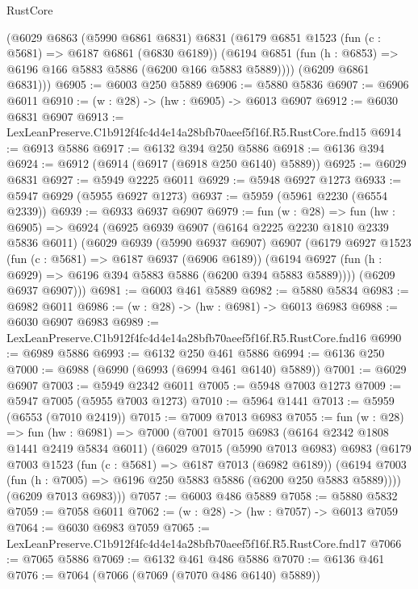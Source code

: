 \begin{lexlean}{RustCore}
\begin{coremodule}
      (@6029
        @6863
        (@5990 @6861 @6831)
        @6831
        (@6179
          @6851
          @1523
          (fun (c : @5681) => @6187 @6861 (@6830 @6189))
          (@6194 @6851 (fun (h : @6853) => @6196 @166 @5883 @5886 (@6200 @166 @5883 @5889))))
        (@6209 @6861 @6831)))
@6905 := @6003 @250 @5889
@6906 := @5880 @5836
@6907 := @6906 @6011
@6910 := (w : @28) -> (hw : @6905) -> @6013 @6907
@6912 := @6030 @6831 @6907
@6913 := LexLeanPreserve.C1b912f4fc4d4e14a28bfb70aeef5f16f.R5.RustCore.fnd15
@6914 := @6913 @5886
@6917 := @6132 @394 @250 @5886
@6918 := @6136 @394
@6924 := @6912 (@6914 (@6917 (@6918 @250 @6140) @5889))
@6925 := @6029 @6831
@6927 := @5949 @2225 @6011
@6929 := @5948 @6927 @1273
@6933 := @5947 @6929 (@5955 @6927 @1273)
@6937 := @5959 (@5961 @2230 (@6554 @2339))
@6939 := @6933 @6937 @6907
@6979 := fun (w : @28) =>
  fun (hw : @6905) =>
  @6924
    (@6925
      @6939
      @6907
      (@6164 @2225 @2230 @1810 @2339 @5836 @6011)
      (@6029
        @6939
        (@5990 @6937 @6907)
        @6907
        (@6179
          @6927
          @1523
          (fun (c : @5681) => @6187 @6937 (@6906 @6189))
          (@6194 @6927 (fun (h : @6929) => @6196 @394 @5883 @5886 (@6200 @394 @5883 @5889))))
        (@6209 @6937 @6907)))
@6981 := @6003 @461 @5889
@6982 := @5880 @5834
@6983 := @6982 @6011
@6986 := (w : @28) -> (hw : @6981) -> @6013 @6983
@6988 := @6030 @6907 @6983
@6989 := LexLeanPreserve.C1b912f4fc4d4e14a28bfb70aeef5f16f.R5.RustCore.fnd16
@6990 := @6989 @5886
@6993 := @6132 @250 @461 @5886
@6994 := @6136 @250
@7000 := @6988 (@6990 (@6993 (@6994 @461 @6140) @5889))
@7001 := @6029 @6907
@7003 := @5949 @2342 @6011
@7005 := @5948 @7003 @1273
@7009 := @5947 @7005 (@5955 @7003 @1273)
@7010 := @5964 @1441
@7013 := @5959 (@6553 (@7010 @2419))
@7015 := @7009 @7013 @6983
@7055 := fun (w : @28) =>
  fun (hw : @6981) =>
  @7000
    (@7001
      @7015
      @6983
      (@6164 @2342 @1808 @1441 @2419 @5834 @6011)
      (@6029
        @7015
        (@5990 @7013 @6983)
        @6983
        (@6179
          @7003
          @1523
          (fun (c : @5681) => @6187 @7013 (@6982 @6189))
          (@6194 @7003 (fun (h : @7005) => @6196 @250 @5883 @5886 (@6200 @250 @5883 @5889))))
        (@6209 @7013 @6983)))
@7057 := @6003 @486 @5889
@7058 := @5880 @5832
@7059 := @7058 @6011
@7062 := (w : @28) -> (hw : @7057) -> @6013 @7059
@7064 := @6030 @6983 @7059
@7065 := LexLeanPreserve.C1b912f4fc4d4e14a28bfb70aeef5f16f.R5.RustCore.fnd17
@7066 := @7065 @5886
@7069 := @6132 @461 @486 @5886
@7070 := @6136 @461
@7076 := @7064 (@7066 (@7069 (@7070 @486 @6140) @5889))

\end{coremodule}
\end{lexlean}
